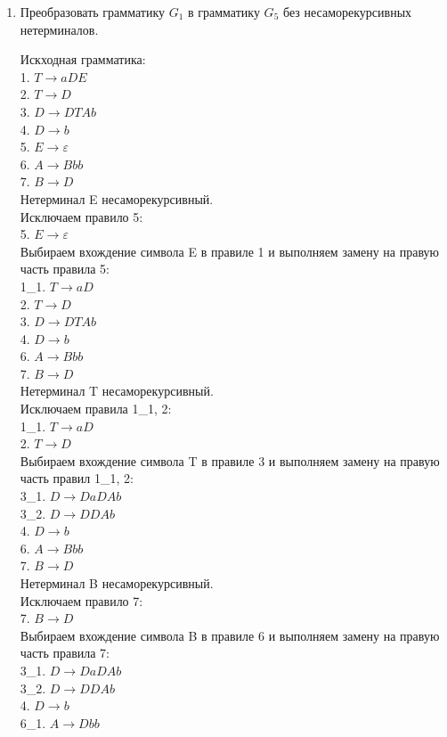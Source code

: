 \documentclass[a4paper,14pt]{extarticle}
\begin{document}
\begin{enumerate}[1.]
\item Преобразовать грамматику $G_1$ в грамматику $G_5$ без несаморекурсивных
нетерминалов.

Искходная грамматика:\\
1. $T \rightarrow aDE$\\
2. $T \rightarrow D$\\
3. $D \rightarrow DTAb$\\
4. $D \rightarrow b$\\
5. $E \rightarrow \varepsilon$\\
6. $A \rightarrow Bbb$\\
7. $B \rightarrow D$\\

Нетерминал E несаморекурсивный.\\
Исключаем правило 5:\\
5. $E \rightarrow \varepsilon$\\
Выбираем вхождение символа E в правиле 1 и
выполняем замену на правую часть правила 5:\\
1\_1. $T \rightarrow aD$\\
2. $T \rightarrow D$\\
3. $D \rightarrow DTAb$\\
4. $D \rightarrow b$\\
6. $A \rightarrow Bbb$\\
7. $B \rightarrow D$\\

Нетерминал T несаморекурсивный.\\
Исключаем правила 1\_1, 2:\\
1\_1. $T \rightarrow aD$\\
2. $T \rightarrow D$\\
Выбираем вхождение символа T в правиле 3 и
выполняем замену на правую часть правил 1\_1, 2:\\
3\_1. $D \rightarrow DaDAb$\\
3\_2. $D \rightarrow DDAb$\\
4. $D \rightarrow b$\\
6. $A \rightarrow Bbb$\\
7. $B \rightarrow D$\\

Нетерминал B несаморекурсивный.\\
Исключаем правило 7:\\
7. $B \rightarrow D$\\
Выбираем вхождение символа B в правиле 6 и
выполняем замену на правую часть правила 7:\\
3\_1. $D \rightarrow DaDAb$\\
3\_2. $D \rightarrow DDAb$\\
4. $D \rightarrow b$\\
6\_1. $A \rightarrow Dbb$\\


\end{enumerate}
\end{document}

